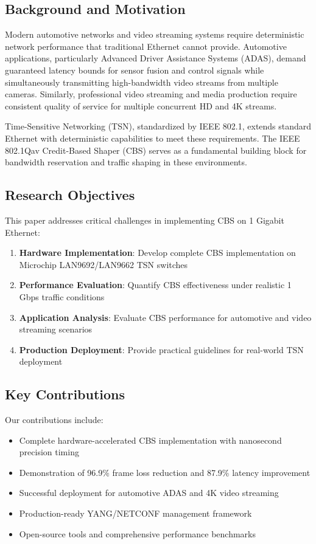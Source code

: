 \documentclass[10pt, journal, compsoc]{IEEEtran}
\begin{document}
\subsection{Background and Motivation}

Modern automotive networks and video streaming systems require deterministic network performance that traditional Ethernet cannot provide. Automotive applications, particularly Advanced Driver Assistance Systems (ADAS), demand guaranteed latency bounds for sensor fusion and control signals while simultaneously transmitting high-bandwidth video streams from multiple cameras. Similarly, professional video streaming and media production require consistent quality of service for multiple concurrent HD and 4K streams.

Time-Sensitive Networking (TSN), standardized by IEEE 802.1, extends standard Ethernet with deterministic capabilities to meet these requirements. The IEEE 802.1Qav Credit-Based Shaper (CBS) serves as a fundamental building block for bandwidth reservation and traffic shaping in these environments.

\subsection{Research Objectives}

This paper addresses critical challenges in implementing CBS on 1 Gigabit Ethernet:

\begin{enumerate}
    \item \textbf{Hardware Implementation}: Develop complete CBS implementation on Microchip LAN9692/LAN9662 TSN switches
    \item \textbf{Performance Evaluation}: Quantify CBS effectiveness under realistic 1 Gbps traffic conditions
    \item \textbf{Application Analysis}: Evaluate CBS performance for automotive and video streaming scenarios
    \item \textbf{Production Deployment}: Provide practical guidelines for real-world TSN deployment
\end{enumerate}

\subsection{Key Contributions}

Our contributions include:

\begin{itemize}
    \item Complete hardware-accelerated CBS implementation with nanosecond precision timing
    \item Demonstration of 96.9\% frame loss reduction and 87.9\% latency improvement
    \item Successful deployment for automotive ADAS and 4K video streaming
    \item Production-ready YANG/NETCONF management framework
    \item Open-source tools and comprehensive performance benchmarks
\end{itemize}
\end{document}
